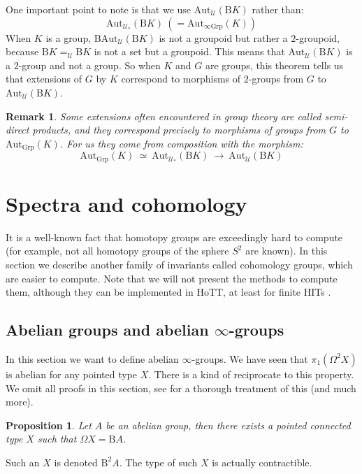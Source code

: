 \documentclass{article}
\newcommand{\se}[1]{\medbreak \medbreak \section{#1}}
\newcommand{\sse}[1]{\medbreak \subsection{#1}}
\newcommand{\U}{{\mathcal U}}
\renewcommand{\r}{\rightarrow}
\newcommand{\Grp}{\mathrm{Grp}}
\newcommand{\B}{\mathrm{B}}
\newcommand{\Aut}{\mathrm{Aut}}
\newtheorem{definition}{Definition}
\newtheorem{proposition}{Proposition}
\newtheorem{remark}{Remark}
\begin{document}
One important point to note is that we use $\Aut_\U(\B K)$ rather than: 
\[\Aut_{\U_*}(\B K)\ (=\Aut_{\infty\Grp}(K))\] 
When $K$ is a group, $\B\Aut_\U(\B K)$ is not a groupoid but rather a $2$-groupoid, because $\B K =_\U\B K$ is not a set but a groupoid. This means that $\Aut_\U(\B K)$ is a $2$-group and not a group. So when $K$ and $G$ are groups, this theorem tells us that extensions of $G$ by $K$ correspond to morphisms of $2$-groups from $G$ to $\Aut_\U(\B K)$.

\begin{remark}
Some extensions often encountered in group theory are called semi-direct products, and they correspond precisely to morphisms of groups from $G$ to $\Aut_\Grp(K)$. For us they come from composition with the morphism:
\[\Aut_\Grp(K) \ \simeq\ \Aut_{\U_*}(\B K) \ \r \ \Aut_\U(\B K)\]
\end{remark}




\se{Spectra and cohomology}

It is a well-known fact that homotopy groups are exceedingly hard to compute (for example, not all homotopy groups of the sphere $S^2$ are known). In this section we describe another family of invariants called cohomology groups, which are easier to compute. Note that we will not present the methods to compute them, although they can be implemented in HoTT, at least for finite HITs \cite{buchholtz2018cellular}.


\sse{Abelian groups and abelian $\infty$-groups}

In this section we want to define abelian $\infty$-groups. We have seen that $\pi_1(\Omega^2 X)$ is abelian for any pointed type $X$. There is a kind of reciprocate to this property. We omit all proofs in this section, see \cite{buchholtz2018higher} for a thorough treatment of this (and much more).%


\begin{proposition}
Let $A$ be an abelian group, then there exists a pointed connected type $X$ such that $\Omega X = \B A$.
\end{proposition}

Such an $X$ is denoted $\B^2A$. The type of such $X$ is actually contractible.
\end{document}
